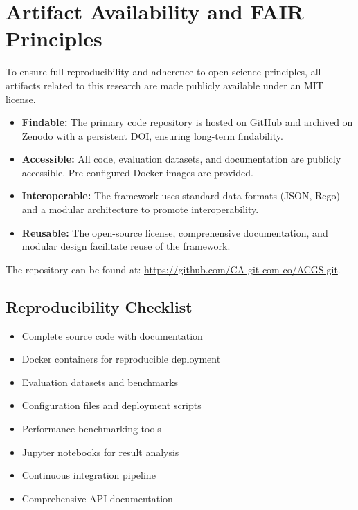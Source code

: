 \documentclass[10pt,twocolumn]{article}
\newcommand{\checkmarkcustom}{\ding{51}}
\theoremstyle{definition}
\begin{document}
\section{Artifact Availability and FAIR Principles}
\label{sec:appendix_artifacts}
To ensure full reproducibility and adherence to open science principles, all artifacts related to this research are made publicly available under an MIT license.

\begin{itemize}[leftmargin=*,topsep=0pt,itemsep=2pt,parsep=0pt]
    \item \textbf{Findable:} The primary code repository is hosted on GitHub and archived on Zenodo with a persistent DOI, ensuring long-term findability.
    \item \textbf{Accessible:} All code, evaluation datasets, and documentation are publicly accessible. Pre-configured Docker images are provided.
    \item \textbf{Interoperable:} The framework uses standard data formats (JSON, Rego) and a modular architecture to promote interoperability.
    \item \textbf{Reusable:} The open-source license, comprehensive documentation, and modular design facilitate reuse of the framework.
\end{itemize}

The repository can be found at: \url{https://github.com/CA-git-com-co/ACGS.git}.

\subsection{Reproducibility Checklist}
\begin{itemize}[leftmargin=*,topsep=0pt,itemsep=2pt,parsep=0pt]
    \item[\checkmarkcustom] Complete source code with documentation
    \item[\checkmarkcustom] Docker containers for reproducible deployment
    \item[\checkmarkcustom] Evaluation datasets and benchmarks
    \item[\checkmarkcustom] Configuration files and deployment scripts
    \item[\checkmarkcustom] Performance benchmarking tools
    \item[\checkmarkcustom] Jupyter notebooks for result analysis
    \item[\checkmarkcustom] Continuous integration pipeline
    \item[\checkmarkcustom] Comprehensive API documentation
\end{itemize}
\end{document}
